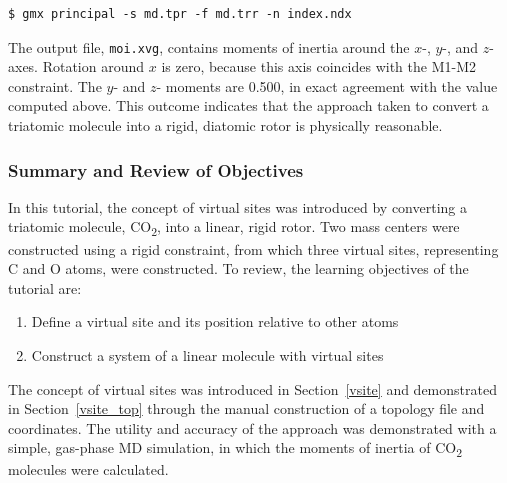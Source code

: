 \documentclass[9pt,tutorial,pubversion]{livecoms}
\begin{document}
\begin{lstlisting}
$ gmx principal -s md.tpr -f md.trr -n index.ndx
\end{lstlisting}
%
The output file, \texttt{moi.xvg}, contains moments of inertia around the $x$-, $y$-, and $z$-axes. Rotation around $x$ is zero, because this axis coincides with the M1-M2 constraint. The $y$- and $z$- moments are 0.500, in exact agreement with the value computed above. This outcome indicates that the approach taken to convert a triatomic molecule into a rigid, diatomic rotor is physically reasonable.

\subsubsection{Summary and Review of Objectives} \label{vsite_summary}

In this tutorial, the concept of virtual sites was introduced by converting a triatomic molecule, CO\textsubscript{2}, into a linear, rigid rotor. Two mass centers were constructed using a rigid constraint, from which three virtual sites, representing C and O atoms, were constructed. To review, the learning objectives of the tutorial are:

\begin{enumerate}
	\item Define a virtual site and its position relative to other atoms
	\item Construct a system of a linear molecule with virtual sites
\end{enumerate}

The concept of virtual sites was introduced in Section~\ref{vsite} and demonstrated in Section~\ref{vsite_top} through the manual construction of a topology file and coordinates. The utility and accuracy of the approach was demonstrated with a simple, gas-phase MD simulation, in which the moments of inertia of CO\textsubscript{2} molecules were calculated.

\end{document}
